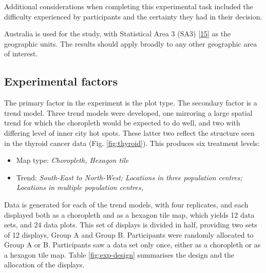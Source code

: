 \documentclass[conference,final,]{IEEEtran}
\providecommand{\tightlist}{%
  \setlength{\itemsep}{0pt}\setlength{\parskip}{0pt}}
\begin{document}
Additional considerations when completing this experimental task included the difficulty experienced by participants and the certainty they had in their decision.

Australia is used for the study, with Statistical Area 3 (SA3) {[}\protect\hyperlink{ref-abs2016}{15}{]} as the geographic units. The results should apply broadly to any other geographic area of interest.

\hypertarget{experimental-factors}{%
\subsection{Experimental factors}\label{experimental-factors}}

The primary factor in the experiment is the plot type. The secondary factor is a trend model. Three trend models were developed, one mirroring a large spatial trend for which the choropleth would be expected to do well, and two with differing level of inner city hot spots. These latter two reflect the structure seen in the thyroid cancer data (Fig. \ref{fig:thyroid}). This produces six treatment levels:

\begin{itemize}
\tightlist
\item
  Map type: \emph{Choropleth, Hexagon tile}
\item
  Trend: \emph{South-East to North-West; Locations in three population centres; Locations in multiple population centres, }
\end{itemize}

Data is generated for each of the trend models, with four replicates, and each displayed both as a choropleth and as a hexagon tile map, which yields 12 data sets, and 24 data plots. This set of displays is divided in half, providing two sets of 12 displays, Group A and Group B. Participants were randomly allocated to Group A or B. Participants saw a data set only once, either as a choropleth or as a hexagon tile map. Table \ref{fig:exp-design} summarises the design and the allocation of the displays.
\end{document}
